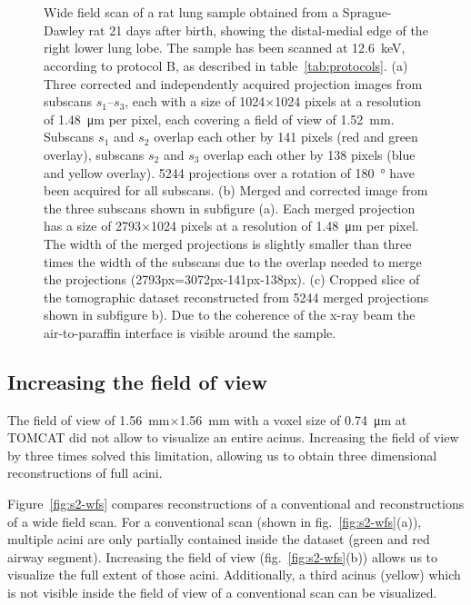 	\begin{figure}[htp]%
		\\%
		\\%
			\caption{Wide field scan of a rat lung sample obtained from a Sprague-Dawley rat 21 days after birth, showing the distal-medial edge of the right lower lung lobe. The sample has been scanned at \SI{12.6}{\kilo\electronvolt}, according to protocol B, as described in table~\ref{tab:protocols}. %
		(a) Three corrected and independently acquired projection images from subscans $s_1$--$s_3$, each with a size of 1024\(\times\)1024 pixels at a resolution of \SI{1.48}{\micro\meter} per pixel, each covering a field of view of \SI{1.52}{\milli\meter}. Subscans $s_1$ and $s_2$ overlap each other by 141 pixels (red and green overlay), subscans $s_2$ and $s_3$ overlap each other by 138 pixels (blue and yellow overlay). 5244 projections over a rotation of \SI{180}{\degree} have been acquired for all subscans. %
		(b) Merged and corrected image from the three subscans shown in subfigure (a). Each merged projection has a size of 2793\(\times\)1024 pixels at a resolution of \SI{1.48}{\micro\meter} per pixel. The width of the merged projections is slightly smaller than three times the width of the subscans due to the overlap needed to merge the projections (2793px=3072px-141px-138px). %
		(c) Cropped slice of the tomographic dataset reconstructed from 5244 merged projections shown in subfigure b). Due to the coherence of the x-ray beam the air-to-paraffin interface is visible around the sample.%
		}%
		\label{fig:wide field scan results}%
	\end{figure}
\fi

\subsection{Increasing the field of view}
The field of view of \SI{1.56}{\milli\meter}$\times$\SI{1.56}{\milli\meter} with a voxel size of \SI{0.74}{\micro\meter} at TOMCAT did not allow to visualize an entire acinus. Increasing the field of view by three times solved this limitation, allowing us to obtain three dimensional reconstructions of full acini.

Figure~\ref{fig:s2-wfs} compares reconstructions of a conventional and reconstructions of a wide field scan. For a conventional scan (shown in fig.~\ref{fig:s2-wfs}(a)), multiple acini are only partially contained inside the dataset (green and red airway segment). Increasing the field of view (fig.~\ref{fig:s2-wfs}(b)) allows us to visualize the full extent of those acini. Additionally, a third acinus (yellow) which is not visible inside the field of view of a conventional scan can be visualized.

